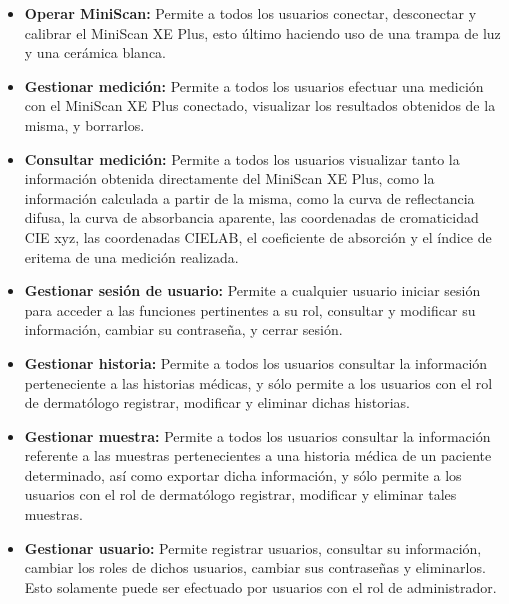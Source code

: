 		\begin{itemize}
			\item \textbf{Operar MiniScan:} Permite a todos los usuarios conectar, desconectar y calibrar el MiniScan XE Plus, esto \'{u}ltimo haciendo uso de una trampa de luz y una cer\'{a}mica blanca.
			
			\item \textbf{Gestionar medici\'{o}n:} Permite a todos los usuarios efectuar una medici\'{o}n con el MiniScan XE Plus conectado, visualizar los resultados obtenidos de la misma, y borrarlos.
			
			\item \textbf{Consultar medici\'{o}n:} Permite a todos los usuarios visualizar tanto la informaci\'{o}n obtenida directamente del MiniScan XE Plus, como la informaci\'{o}n calculada a partir de la misma, como la curva de reflectancia difusa, la curva de absorbancia aparente, las coordenadas de cromaticidad CIE xyz, las coordenadas CIELAB, el coeficiente de absorci\'{o}n y el \'{i}ndice de eritema de una medici\'{o}n realizada.
			
			\item \textbf{Gestionar sesi\'{o}n de usuario:} Permite a cualquier usuario iniciar sesi\'{o}n para acceder a las funciones pertinentes a su rol, consultar y modificar su informaci\'{o}n, cambiar su contrase\~{n}a, y cerrar sesi\'{o}n.
			
			\item \textbf{Gestionar historia:} Permite a todos los usuarios consultar la informaci\'{o}n perteneciente a las historias m\'{e}dicas, y s\'{o}lo permite a los usuarios con el rol de dermat\'{o}logo registrar, modificar y eliminar dichas historias. 
			
			\item \textbf{Gestionar muestra:} Permite a todos los usuarios consultar la informaci\'{o}n referente a las muestras pertenecientes a una historia m\'{e}dica de un paciente determinado, as\'{i} como exportar dicha informaci\'{o}n, y s\'{o}lo permite a los usuarios con el rol de dermat\'{o}logo registrar, modificar y eliminar tales muestras.
			
			\item \textbf{Gestionar usuario:} Permite registrar usuarios, consultar su informaci\'{o}n, cambiar los roles de dichos usuarios, cambiar sus contrase\~{n}as y eliminarlos. Esto solamente puede ser efectuado por usuarios con el rol de administrador.
		\end{itemize}

